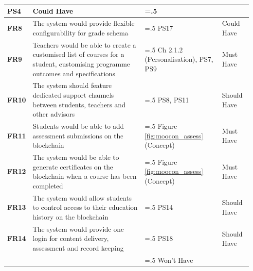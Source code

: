 \begin{table}[!h]
\begin{tabularx}{\textwidth}{>{\bfseries}l>{\hsize=1.5\hsize}X>{\hsize=.5\hsize}Xl}
		PS4                                                       & Could Have
		\\\midrule
		FR8                                                       & The system would provide flexible configurability for grade schema                & PS17
		                                                          & Could Have
		\\\midrule
		FR9                                                       & Teachers would be able to create a customised list of courses
		for a student, customising programme outcomes and specifications
		                                                          & Ch 2.1.2 (Personalisation), PS7, PS9                                              & Must Have
		\\\midrule
		FR10                                                      & The system should feature dedicated support channels between students, teachers
		and other advisors
		                                                          & PS8, PS11                                                                         & Should Have
		\\\midrule
		FR11                                                      & Students would be able to add assessment submissions on the blockchain
		                                                          & Figure \ref{fig:moocon_assess} (Concept)                                          & Must Have
		\\\midrule
		FR12                                                      & The system would be able to generate certificates on the blockchain when a course
		has been completed                                        & Figure \ref{fig:moocon_assess} (Concept)                                          & Must Have
		\\\midrule
		FR13                                                      & The system would allow students to control access to their education history
		on the blockchain                                         & PS14                                                                              & Should Have
		\\\midrule
		FR14                                                      & The system would provide one login for content delivery, assessment and
		record keeping                                            & PS18                                                                              & Should Have
		\\\midrule
		                                                          & \multicolumn{2}{c}{Requirements targetting PS6, PS10, PS13, PS16}                 & Won't Have
		\\\bottomrule
	\end{tabularx}
\end{table}

